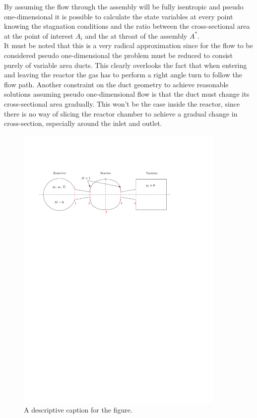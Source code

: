 By assuming the flow through the assembly will be fully isentropic and pseudo one-dimensional it is possible to calculate the state variables at every point knowing the stagnation conditions and the ratio between the cross-sectional area at the point of interest $A_i$ and the at throat of the assembly $A^*$.\\
It must be noted that this is a very radical approximation since for the flow to be  considered pseudo one-dimensional the problem must be reduced to consist purely of variable area ducts.
This clearly overlooks the fact that when entering and leaving the reactor the gas has to perform a right angle turn to follow the flow path.
Another constraint on the duct geometry to achieve reasonable solutions assuming pseudo one-dimensional flow is that the duct must change its cross-sectional area gradually.
\cite{anderson2021modern}
This won't be the case inside the reactor, since there is no way of slicing the reactor chamber to achieve a gradual change in cross-section, especially around the inlet and outlet.

\begin{figure}[H]
    \centering
    \includegraphics[width=0.9\textwidth]{src/03_analytical-work/fig_1d-flow-geometry}
    \caption{A descriptive caption for the figure.}
    \label{fig:example_figure}
\end{figure}

